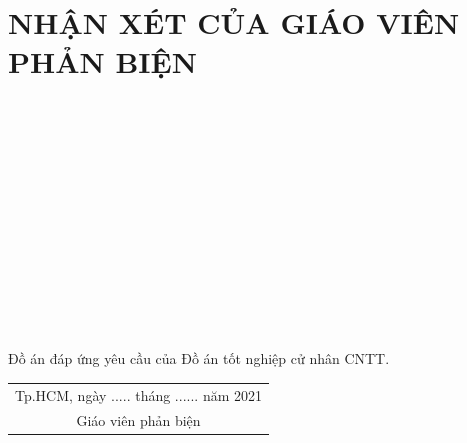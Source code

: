 \chapter*{NHẬN XÉT CỦA GIÁO VIÊN PHẢN BIỆN}
\label{nhanxetgiaovienphanbien}	
\begin{center}
{	\dotfill\\[0.5cm]	\dotfill\\[0.5cm]	\dotfill\\[0.5cm]	\dotfill\\[0.5cm]
	\dotfill\\[0.5cm]	\dotfill\\[0.5cm]	\dotfill\\[0.5cm]	\dotfill\\[0.5cm]	\dotfill\\[0.5cm]	\dotfill\\[0.5cm]	\dotfill\\[0.5cm]	\dotfill\\[0.5cm]
}
\end{center}


Đồ án đáp ứng yêu cầu của Đồ án tốt nghiệp cử nhân CNTT.

\begin{flushright}
	\begin{tabular}{@{}c@{}}
		Tp.HCM, ngày ..... tháng ...... năm 2021\\
		Giáo viên phản biện
	\end{tabular}
\end{flushright}
